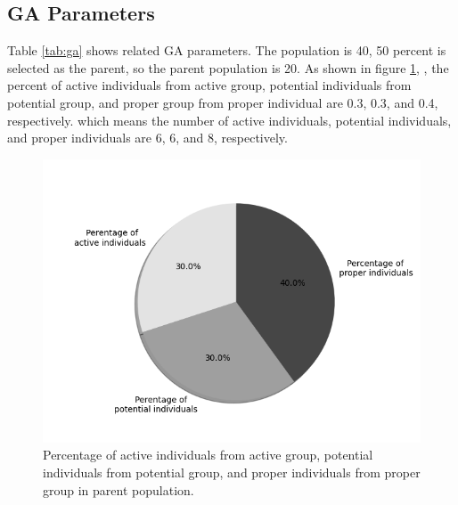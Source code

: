\subsection{GA Parameters}
Table \ref{tab:ga} shows related GA parameters. The population is 40, 50
percent is selected as the parent, so the parent population is 20. As shown in figure \ref{fig:group},
, the percent of active individuals from active group, potential
individuals from potential group, and proper group from proper individual are
0.3, 0.3, and 0.4, respectively. which means the number of active individuals,
potential individuals, and proper individuals are 6, 6, and 8, respectively.

\begin{figure}[!htb]
	\centering
	\includegraphics[width=\linewidth]{fig/percentage_of_groups}
	\caption{Percentage of active individuals from active group, potential
	  individuals from potential group, and proper individuals from proper group
	 in parent population.}
	\label{fig:group}
\end{figure}



